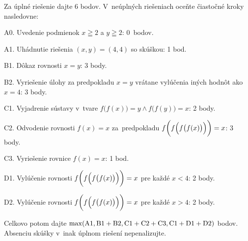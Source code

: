 {\schemaABC
Za úplné riešenie dajte 6 bodov. V~neúplných riešeniach oceňte čiastočné kroky nasledovne:
\item{A0.} Uvedenie podmienok $x\geqq2$ a $y\geqq2$: 0~bodov.
\item{A1.} Uhádnutie riešenia $(x,y)=(4,4)$ so skúškou: 1 bod.
\item{B1.} Dôkaz rovnosti $x=y$: 3 body.
\item{B2.} Vyriešenie úlohy za predpokladu $x=y$ vrátane vylúčenia iných hodnôt ako $x=4$: 3 body.
\item{C1.} Vyjadrenie sústavy v~tvare $f\bigl(f(x)\bigr)=y\land f\bigl(f(y)\bigr)=x$: 2 body.
\item{C2.} Odvodenie rovnosti $f(x)=x$ za~predpokladu $f\biggl(f\Bigl(f\bigl(f(x)\bigr)\Bigr)\biggr)=x$: 3 body.
\item{C3.} Vyriešenie rovnice $f(x)=x$: 1 bod.
\item{D1.} Vylúčenie rovnosti $f\biggl(f\Bigl(f\bigl(f(x)\bigr)\Bigr)\biggr)=x$ pre každé $x<4$: 2 body.
\item{D2.} Vylúčenie rovnosti $f\biggl(f\Bigl(f\bigl(f(x)\bigr)\Bigr)\biggr)=x$ pre každé $x>4$: 2 body.

\noindent
Celkovo potom dajte $\rm\max(A1,B1+B2,C1+C2+C3,C1+D1+D2)$ bodov.
Absenciu skúšky v~inak úplnom riešení nepenalizujte.
\endschema

}


